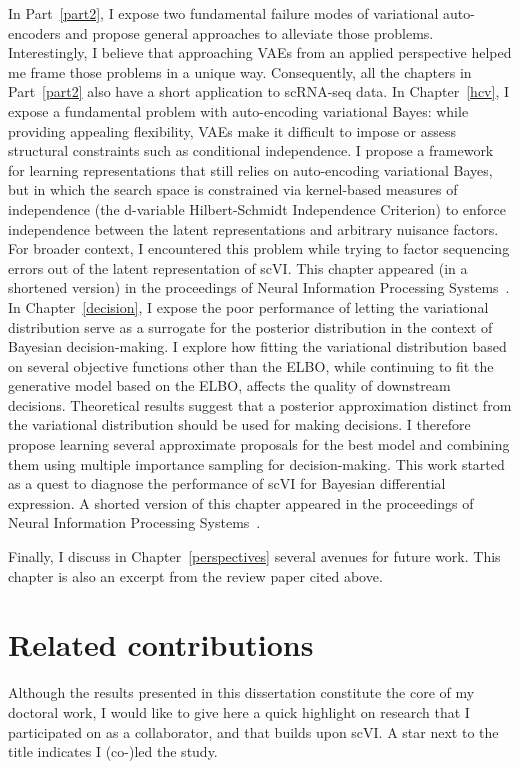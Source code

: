 In Part~\ref{part2}, I expose two fundamental failure modes of variational auto-encoders and propose general approaches to alleviate those problems. Interestingly, I believe that approaching VAEs from an applied perspective helped me frame those problems in a unique way. Consequently, all the chapters in Part~\ref{part2} also have a short application to scRNA-seq data. In Chapter~\ref{hcv}, I expose a fundamental problem with auto-encoding variational Bayes: while providing appealing flexibility, VAEs make it difficult to impose or assess structural constraints such as conditional independence. I propose a framework for learning representations that still relies on auto-encoding variational Bayes, but in which the search space is constrained via kernel-based measures of independence (the d-variable Hilbert-Schmidt Independence Criterion) to enforce independence between the latent representations and
arbitrary nuisance factors. For broader context, I encountered this problem while trying to factor sequencing errors out of the latent representation of scVI. This chapter appeared (in a shortened version) in the proceedings of Neural Information Processing Systems~\cite{lopez.information}. In Chapter~\ref{decision}, I expose the poor performance of letting the variational distribution serve as a surrogate for the posterior distribution in the context of Bayesian decision-making. I explore how fitting the variational distribution based on several objective functions other than the ELBO, while continuing to fit the generative model based on the ELBO, affects the quality of downstream decisions. Theoretical results suggest that a posterior approximation distinct from the variational distribution should be used for making decisions. I therefore propose learning several approximate proposals for the best model and combining them using multiple importance sampling for decision-making. This work started as a quest to diagnose the performance of scVI for Bayesian differential expression. A shorted version of this chapter appeared in the proceedings of Neural Information Processing Systems~\cite{romain.decision}.

Finally, I discuss in Chapter~\ref{perspectives} several avenues for future work. This chapter is also an excerpt from the review paper cited above. 

\section{Related contributions}
Although the results presented in this dissertation constitute the core of my doctoral work, I would like to give here a quick highlight on research that I participated on as a collaborator, and that builds upon scVI. A star next to the title indicates I (co-)led the study.

